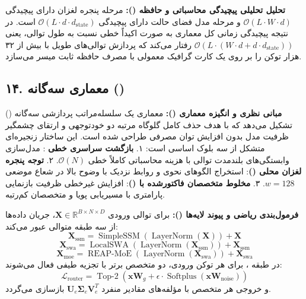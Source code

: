 \textbf{تحلیل تحلیلی پیچیدگی محاسباتی و حافظه ():}
مرحله پنجره لغزان دارای پیچیدگی $\mathcal{O}(L \cdot W \cdot d)$ و مرحله مدل فضای حالت دارای پیچیدگی $\mathcal{O}(L \cdot d \cdot d_{\text{state}})$ است. در نتیجه پیچیدگی زمانی کل معماری به صورت اکیداً خطی نسبت به طول توالی، یعنی $\mathcal{O}(L \cdot (W \cdot d + d \cdot d_{\text{state}}))$ رفتار می‌کند که پردازش توالی‌های طویل با بیش از ۳۲ هزار توکن را بر روی یک کارت گرافیک معمولی با مصرف حافظه ثابت میسر می‌سازد.



\subsection*{۱۴. معماری سه‌گانه  ()}

\textbf{مبانی نظری و انگیزه معماری ():}
معماری  یک سلسله‌مراتب پردازشی سه‌گانه () تشکیل می‌دهد که با هدف حذف کامل گلوگاه مرتبه دو خودتوجهی و ارتقای چشمگیر ظرفیت مدل بدون افزایش توان مصرفی طراحی شده است. این ساختار زنجیره‌ای متشکل از سه بلوک اساسی است:
۱. \textbf{بازگشت سراسری خطی }: مدل‌سازی وابستگی‌های بلندمدت توالی با هزینه محاسباتی کاملاً خطی $\mathcal{O}(N)$.
۲. \textbf{توجه پنجره لغزان محلی ()}: استخراج الگوهای نحوی و روابط نزدیک با وضوح بالا در شعاع موضعی $w = 128$.
۳. \textbf{مخلوط متخصصان فاکتورشده با  ()}: افزایش غیرخطی ظرفیت بازنمایی پارامتری با مسیریابی پویا و متخصصان کم‌رتبه.

\textbf{فرمول‌بندی ریاضی و پیوند لایه‌ها ():}
برای توالی ورودی $\mathbf{X} \in \mathbb{R}^{B \times N \times D}$، جریان داده‌ها از سه طبقه متوالی عبور می‌کند:
\begin{equation}
\mathbf{X}_{\text{ssm}} = \operatorname{SimpleSSM}(\operatorname{LayerNorm}(\mathbf{X})) + \mathbf{X}
\end{equation}
\begin{equation}
\mathbf{X}_{\text{swa}} = \operatorname{LocalSWA}(\operatorname{LayerNorm}(\mathbf{X}_{\text{ssm}})) + \mathbf{X}_{\text{ssm}}
\end{equation}
\begin{equation}
\mathbf{X}_{\text{moe}} = \operatorname{REAP-MoE}(\operatorname{LayerNorm}(\mathbf{X}_{\text{swa}})) + \mathbf{X}_{\text{swa}}
\end{equation}
در طبقه ، برای هر توکن ورودی، دو متخصص برتر با تجزیه طیفی فعال می‌شوند:
\begin{equation}
\mathcal{L}_{\text{router}} = \operatorname{Top-2}\left(\mathbf{x} \mathbf{W}_g + \epsilon \cdot \operatorname{Softplus}(\mathbf{x} \mathbf{W}_{\text{noise}})\right)
\end{equation}
و خروجی هر متخصص با مؤلفه‌های مقادیر منفرد $\mathbf{U}_e \mathbf{\Sigma}_e \mathbf{V}_e^T$ بازسازی می‌گردد.

